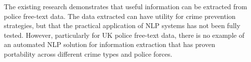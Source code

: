 The existing research demonstrates that useful information can be extracted from police free-text data. The data extracted can have utility for crime prevention strategies, but that the practical application of NLP systems has not been fully tested. However, particularly for UK police free-text data, there is no example of an automated NLP solution for information extraction that has proven portability across different crime types and police forces.  


